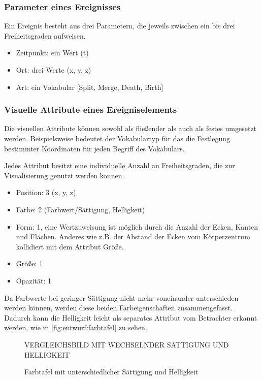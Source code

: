 \subsubsection{Parameter eines Ereignisses}
Ein Ereignis besteht aus drei Parametern, die jeweils zwischen ein bis drei Freiheitsgraden aufweisen.

\begin{itemize}
	\item Zeitpunkt: ein Wert (t)
	\item Ort: drei Werte (x, y, z)
	\item Art: ein Vokabular [Split, Merge, Death, Birth]
\end{itemize}

\subsubsection{Visuelle Attribute eines Ereigniselements}\label{sec:attribute}
Die visuellen Attribute können sowohl als fließender  als auch als festes  umgesetzt werden. Beispielsweise bedeutet der Vokabulartyp für das  die Festlegung bestimmter Koordinaten für jeden Begriff des Vokabulars.

Jedes Attribut besitzt eine individuelle Anzahl an Freiheitsgraden, die zur Visualisierung genutzt werden können.

\begin{itemize}
	\item Position: 3 (x, y, z)
	\item Farbe: 2 (Farbwert/Sättigung, Helligkeit)
	\item Form: 1, eine Wertzuweisung ist möglich durch die Anzahl der Ecken, Kanten und Flächen. Anderes wie z.B. der Abstand der Ecken vom Körperzentrum kollidiert mit dem Attribut Größe.
	\item Größe: 1
	\item Opazität: 1
\end{itemize}

Da Farbwerte bei geringer Sättigung nicht mehr voneinander unterschieden werden können, werden diese beiden Farbeigenschaften zusammengefasst. Dadurch kann die Helligkeit leicht als separates Attribut vom Betrachter erkannt werden, wie in \autoref{fig:entwurf:farbtafel} zu sehen.

\begin{figure}
	VERGLEICHSBILD MIT WECHSELNDER SÄTTIGUNG UND HELLIGKEIT
	\caption{Farbtafel mit unterschiedlicher Sättigung und Helligkeit}\label{fig:entwurf:farbtafel}
\end{figure}

